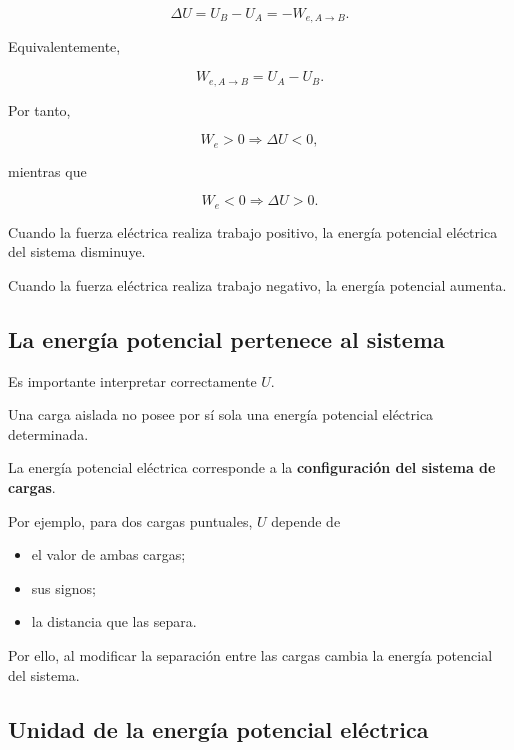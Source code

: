 \begin{equation}
\boxed{
\Delta U=U_B-U_A=-W_{e,A\to B}
}.
\label{eq:cambio_energia_potencial}
\end{equation}

Equivalentemente,

\begin{equation}
\boxed{
W_{e,A\to B}=U_A-U_B
}.
\label{eq:trabajo_cambio_energia}
\end{equation}

Por tanto,

\[
W_e>0
\Longrightarrow
\Delta U<0,
\]

mientras que

\[
W_e<0
\Longrightarrow
\Delta U>0.
\]

\begin{idea}

Cuando la fuerza eléctrica realiza trabajo positivo, la energía potencial eléctrica
del sistema disminuye.

Cuando la fuerza eléctrica realiza trabajo negativo, la energía potencial aumenta.

\end{idea}


\subsection{La energía potencial pertenece al sistema}

Es importante interpretar correctamente \(U\).

Una carga aislada no posee por sí sola una energía potencial eléctrica determinada.

La energía potencial eléctrica corresponde a la \textbf{configuración del sistema de
cargas}.

Por ejemplo, para dos cargas puntuales, \(U\) depende de

\begin{itemize}
    \item el valor de ambas cargas;
    \item sus signos;
    \item la distancia que las separa.
\end{itemize}

Por ello, al modificar la separación entre las cargas cambia la energía potencial
del sistema.


\subsection{Unidad de la energía potencial eléctrica}

